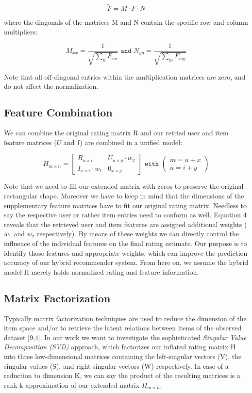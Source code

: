 \documentclass[11pt,letterpaper]{article}
\begin{document}
$$ \widetilde{F} = M\cdot F\cdot N $$

where the diagonals of the matrices M and N contain the specific row and column multipliers:

$$ M_{xx} = \frac{1}{\sqrt{\sum_n F_{xn}}} \texttt{ and } N_{yy} = \frac{1}{\sqrt{\sum_m F_{my}}}$$

Note that all off-diagonal entries within the multiplication matrices are zero, and do not affect the normalization.

\subsection{Feature Combination}

We can combine the original rating matrix R and our retried user and item feature matrices ($U$ and $I$) are combined in a unified model:

$$ H_{m\times n} = \begin{bmatrix} R_{u\times i} & U_{u\times y}\cdot w_2 \\ I_{x\times i}\cdot w_1 & 0_{x\times y} \end{bmatrix} \texttt{ with } \begin{pmatrix} m = u + x \\ n = i + y \end{pmatrix}$$

Note that we need to fill our extended matrix with zeros to preserve the original rectangular shape. Moreover we have to keep in mind that the dimensions of the supplementary feature matrices have to fit our original rating matrix. Needless to say the respective user or rather item entries need to conform as well. Equation 4 reveals that the retrieved user and item features are assigned additional weights ($w_1$ and $w_2$ respectively). By means of these weights we can directly control the influence of the individual features on the final rating estimate. Our purpose is to identify those features and appropriate weights, which can improve the prediction accuracy of our hybrid recommender system. From here on, we assume the hybrid model H merely holds normalized rating and feature information.

\subsection{Matrix Factorization}

Typically matrix factorization techniques are used to reduce the dimension of the item space and/or to retrieve the latent relations between items of the observed dataset [9,4]. In our work we want to investigate the sophisticated \textit{Singular Value Decomposition (SVD)} approach, which factorizes our inflated rating matrix H into three low-dimensional matrices containing the left-singular vectors (V), the singular values (S), and right-singular vectors (W) respectively. In case of a reduction to dimension K, we can say the product of the resulting matrices is a rank-k approximation of our extended matrix $H_{m\times n}$:
\end{document}
